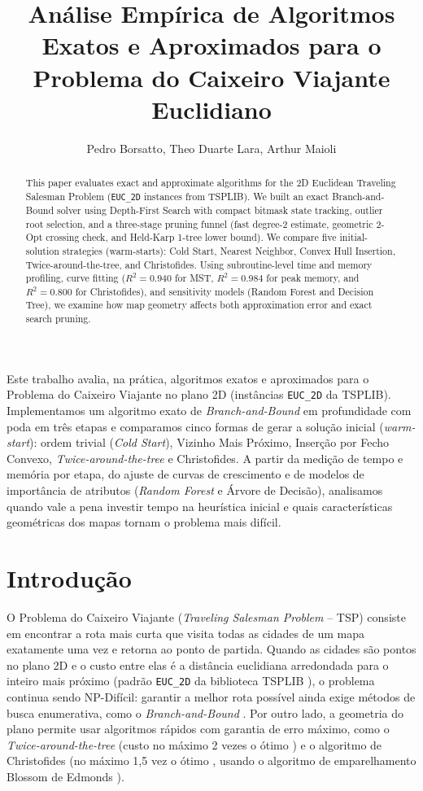 \documentclass[12pt]{article}
\title{Análise Empírica de Algoritmos Exatos e Aproximados para o Problema do Caixeiro Viajante Euclidiano}
\author{Pedro Borsatto\inst{1}, Theo Duarte Lara\inst{1}, Arthur Maioli\inst{1}}
\begin{document}
\maketitle

\begin{abstract}
  This paper evaluates exact and approximate algorithms for the 2D Euclidean Traveling Salesman Problem (\texttt{EUC\_2D} instances from TSPLIB). We built an exact Branch-and-Bound solver using Depth-First Search with compact bitmask state tracking, outlier root selection, and a three-stage pruning funnel (fast degree-2 estimate, geometric 2-Opt crossing check, and Held-Karp 1-tree lower bound). We compare five initial-solution strategies (warm-starts): Cold Start, Nearest Neighbor, Convex Hull Insertion, Twice-around-the-tree, and Christofides. Using subroutine-level time and memory profiling, curve fitting ($R^2 = 0.940$ for MST, $R^2 = 0.984$ for peak memory, and $R^2 = 0.800$ for Christofides), and sensitivity models (Random Forest and Decision Tree), we examine how map geometry affects both approximation error and exact search pruning.
\end{abstract}

\begin{resumo}
  Este trabalho avalia, na prática, algoritmos exatos e aproximados para o Problema do Caixeiro Viajante no plano 2D (instâncias \texttt{EUC\_2D} da TSPLIB). Implementamos um algoritmo exato de \textit{Branch-and-Bound} em profundidade com poda em três etapas e comparamos cinco formas de gerar a solução inicial (\textit{warm-start}): ordem trivial (\textit{Cold Start}), Vizinho Mais Próximo, Inserção por Fecho Convexo, \textit{Twice-around-the-tree} e Christofides. A partir da medição de tempo e memória por etapa, do ajuste de curvas de crescimento e de modelos de importância de atributos (\textit{Random Forest} e Árvore de Decisão), analisamos quando vale a pena investir tempo na heurística inicial e quais características geométricas dos mapas tornam o problema mais difícil.
\end{resumo}

\section{Introdução}

O Problema do Caixeiro Viajante (\textit{Traveling Salesman Problem} -- TSP) consiste em encontrar a rota mais curta que visita todas as cidades de um mapa exatamente uma vez e retorna ao ponto de partida. Quando as cidades são pontos no plano 2D e o custo entre elas é a distância euclidiana arredondada para o inteiro mais próximo (padrão \texttt{EUC\_2D} da biblioteca TSPLIB \cite{reinelt1991tsplib}), o problema continua sendo NP-Difícil: garantir a melhor rota possível ainda exige métodos de busca enumerativa, como o \textit{Branch-and-Bound} \cite{held1970traveling}. Por outro lado, a geometria do plano permite usar algoritmos rápidos com garantia de erro máximo, como o \textit{Twice-around-the-tree} (custo no máximo 2 vezes o ótimo \cite{cormen2022introduction}) e o algoritmo de Christofides (no máximo 1,5 vez o ótimo \cite{christofides1976worst}, usando o algoritmo de emparelhamento Blossom de Edmonds \cite{edmonds1965paths}).
\end{document}
